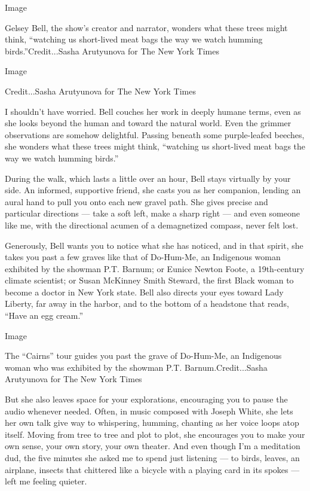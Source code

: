 Image

Gelsey Bell, the show's creator and narrator, wonders what these trees
might think, ``watching us short-lived meat bags the way we watch
humming birds.''Credit...Sasha Arutyunova for The New York Times

Image

Credit...Sasha Arutyunova for The New York Times

I shouldn't have worried. Bell couches her work in deeply humane terms,
even as she looks beyond the human and toward the natural world. Even
the grimmer observations are somehow delightful. Passing beneath some
purple-leafed beeches, she wonders what these trees might think,
``watching us short-lived meat bags the way we watch humming birds.''

During the walk, which lasts a little over an hour, Bell stays virtually
by your side. An informed, supportive friend, she casts you as her
companion, lending an aural hand to pull you onto each new gravel path.
She gives precise and particular directions --- take a soft left, make a
sharp right --- and even someone like me, with the directional acumen of
a demagnetized compass, never felt lost.

Generously, Bell wants you to notice what she has noticed, and in that
spirit, she takes you past a few graves like that of Do-Hum-Me, an
Indigenous woman exhibited by the showman P.T. Barnum; or Eunice Newton
Foote, a 19th-century climate scientist; or Susan McKinney Smith
Steward, the first Black woman to become a doctor in New York state.
Bell also directs your eyes toward Lady Liberty, far away in the harbor,
and to the bottom of a headstone that reads, ``Have an egg cream.''

Image

The ``Cairns'' tour guides you past the grave of Do-Hum-Me, an
Indigenous woman who was exhibited by the showman P.T.
Barnum.Credit...Sasha Arutyunova for The New York Times

But she also leaves space for your explorations, encouraging you to
pause the audio whenever needed. Often, in music composed with Joseph
White, she lets her own talk give way to whispering, humming, chanting
as her voice loops atop itself. Moving from tree to tree and plot to
plot, she encourages you to make your own sense, your own story, your
own theater. And even though I'm a meditation dud, the five minutes she
asked me to spend just listening --- to birds, leaves, an airplane,
insects that chittered like a bicycle with a playing card in its spokes
--- left me feeling quieter.

